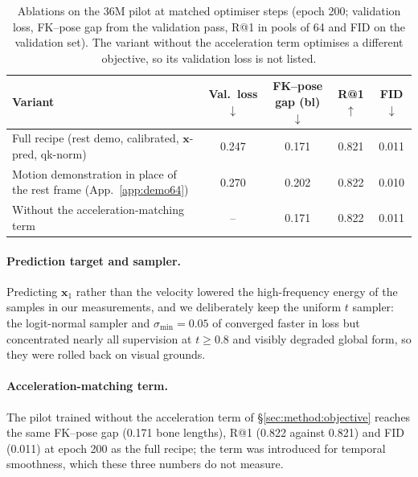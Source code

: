 \begin{table}[h]
\centering\small
\caption{Ablations on the \num{36}M pilot at matched optimiser steps (epoch 200;
validation loss, FK--pose gap from the validation pass, R@1 in pools of 64 and FID on the validation set). The variant without the
acceleration term optimises a different objective, so its validation loss is not listed.}\label{tab:ablation}
\footnotesize\setlength{\tabcolsep}{3pt}
\begin{tabular}{@{}lcccc@{}}
\toprule
Variant & Val.\ loss$\downarrow$ & FK--pose gap (bl)$\downarrow$ & R@1$\uparrow$ & FID$\downarrow$ \\
\midrule
Full recipe (rest demo, calibrated, $\mathbf{x}$-pred, qk-norm) & \num{0.247} & \num{0.171} & \num{0.821} & \num{0.011} \\
Motion demonstration in place of the rest frame (App.~\ref{app:demo64}) & \num{0.270} & \num{0.202} & \num{0.822} & \num{0.010} \\
Without the acceleration-matching term & -- & \num{0.171} & \num{0.822} & \num{0.011} \\
\bottomrule
\end{tabular}
\end{table}

\paragraph{Prediction target and sampler.} Predicting
$\mathbf{x}_1$ rather than the velocity lowered the high-frequency energy of the samples in our
measurements, and we deliberately keep the uniform $t$ sampler: the logit-normal sampler and $\sigma_{\min}{=}0.05$ of \citet{li2025jit} converged
faster in loss but concentrated nearly all supervision at $t\ge0.8$ and visibly degraded global
form, so they were rolled back on visual grounds.

\paragraph{Acceleration-matching term.} The pilot trained without the acceleration term of
\S\ref{sec:method:objective} reaches the same FK--pose gap (\num{0.171} bone lengths), R@1 (\num{0.822}
against \num{0.821}) and FID (\num{0.011}) at epoch 200 as the full recipe; the term was introduced
for temporal smoothness, which these three numbers do not measure.

